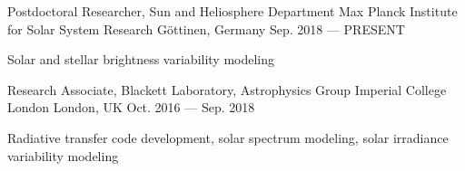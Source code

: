

\begin{cventries}

  \cventry
    {Postdoctoral Researcher, Sun and Heliosphere Department} %
    {Max Planck Institute for Solar System Research} %
    {G{\"o}ttinen, Germany} %
    {Sep. 2018 --- PRESENT} %
    {
      \begin{cvitems} %
        \item {Solar and stellar brightness variability modeling}
      \end{cvitems}
    }

  \cventry
    {Research Associate, Blackett Laboratory, Astrophysics Group} %
    {Imperial College London} %
    {London, UK} %
    {Oct. 2016 --- Sep. 2018} %
    {
      \begin{cvitems} %
        \item {Radiative transfer code development, solar spectrum modeling, solar irradiance variability modeling}
      \end{cvitems}
    }


\end{cventries}
